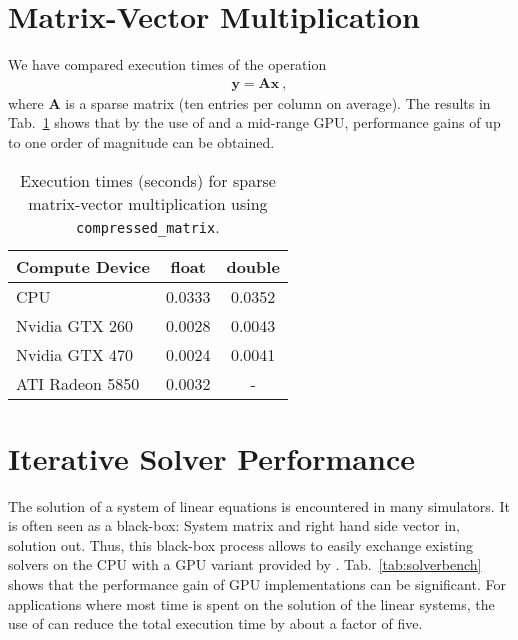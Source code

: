 \section{Matrix-Vector Multiplication}
We have compared execution times of the operation
\begin{align}
 \mathbf{y} = \mathbf{A} \mathbf{x} \ ,
\end{align}
where $\mathbf{A}$ is a sparse matrix (ten entries per column on average). The results in Tab.~\ref{tab:sparsebench} shows that by the use of {\ViennaCL} and a mid-range GPU, performance gains of up to one order of magnitude can be obtained.

\begin{table}[tb]
\begin{center}
\begin{tabular}{l|c|c}
Compute Device & float & double \\
\hline
CPU             & 0.0333 & 0.0352 \\
Nvidia GTX 260  & 0.0028 & 0.0043 \\
Nvidia GTX 470  & 0.0024 & 0.0041 \\
ATI Radeon 5850 & 0.0032 & - \\
\end{tabular}
\caption{Execution times (seconds) for sparse matrix-vector multiplication using \texttt{compressed\_matrix}.}
\label{tab:sparsebench}
\end{center}
\end{table}

\section{Iterative Solver Performance}
The solution of a system of linear equations is encountered in many simulators. It is often seen as a black-box: System matrix and right hand side vector in, solution out. Thus, this black-box process allows to easily exchange existing solvers on the CPU with a GPU variant provided by {\ViennaCL}. Tab.~\ref{tab:solverbench} shows that the performance gain of GPU implementations can be significant. For applications where most time is spent on the solution of the linear systems, the use of {\ViennaCL} can reduce the total execution time by about a factor of five.


